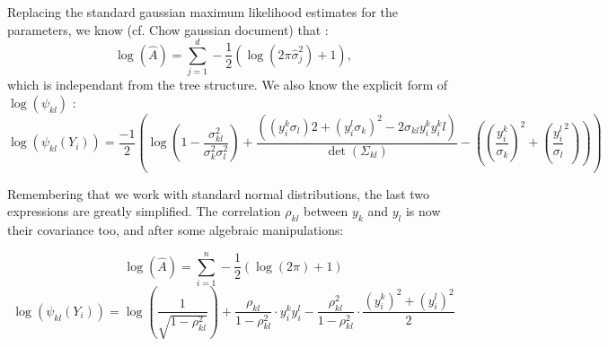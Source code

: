 \documentclass[a4paper,10pt]{article}
\begin{document}
Replacing the standard gaussian maximum likelihood estimates for the parameters, we know (cf. Chow gaussian document) that : 
\[\log(\hat{A}) = \sum_{j=1}^d-\frac{1}{2}\left(\log(2\pi\hat{\sigma}_j^2)+1\right),\]
which is independant from the tree structure. We also know the explicit form of $\log(\psi_{kl})$ :
\[\log(\psi_{kl}(Y_i))=\frac{-1}{2}\left(\log\left(1-\frac{\sigma_{kl}^2}{\sigma_k^2 \sigma_{l}^2}\right)+\frac{((y_i^k\sigma_{l})2+(y_i^{l}\sigma_k)^2-2\sigma_{kl}y_i^ky_i^k{l})}
{\det(\Sigma_{kl})}-\left(\left(\frac{y_i^k}{\sigma_k}\right)^2+\left(\frac{y_i^{l}}{\sigma_{l}}^2\right)\right)\right)\]

Remembering that we work with standard normal distributions, the last two expressions are greatly simplified. The correlation $\rho_{kl}$ 
between $y_k$ and $y_l$ is now their covariance too, and after some algebraic manipulations:

\[\log(\hat{A}) = \sum_{i=1}^n-\frac{1}{2}\left(\log(2\pi)+1\right)\]
\[\log(\psi_{kl}(Y_i))=\log\left(\frac{1}{\sqrt{1-\rho_{kl}^2}}\right)+\frac{\rho_{kl}}{1-\rho_{kl}^2}\cdot y_i^ky_i^l - 
\frac{\rho_{kl}^2}{1-\rho_{kl}^2}\cdot \frac{(y_i^k)^2 + (y_i^l)^2}{2}\]
\end{document}
